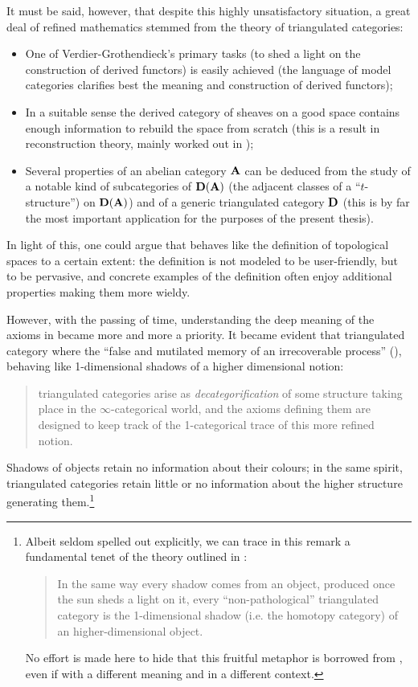 It must be said, however, that despite this highly unsatisfactory situation, a great deal of refined mathematics stemmed from the theory of triangulated categories:
\begin{itemize} 
\item One of Verdier\hyp{}Grothendieck's primary tasks (to shed a light on the construction of derived functors) is easily achieved (the language of model categories clarifies best the meaning and construction of derived functors); 
\item In a suitable sense the derived category of sheaves on a good space contains enough information to rebuild the space from scratch (this is a result in reconstruction theory, mainly worked out in \cite{bondal2001reconstruction});
\item {} Several properties of an abelian category $\textbf{A}$ can be deduced from the study of a notable kind of subcategories of $\textbf{D}(\textbf{A})$ (the adjacent classes of a ``$t$\hyp{}structure'') on $\textbf{D}(\textbf{A})$) and of a generic triangulated category $\textbf{D}$ (this is by far the most important application for the purposes of the present thesis).
\end{itemize}
In light of this, one could argue that \adef {} behaves like the definition of topological spaces to a certain extent: the definition is not modeled to be user\hyp{}friendly, but to be pervasive, and concrete examples of the definition often enjoy additional properties making them more wieldy. 

However, with the passing of time, understanding the deep meaning of the axioms in \adef {} became more and more a priority. It became evident that triangulated category where the ``false and mutilated memory of an irrecoverable process'' (\cite{borgesEN}), behaving like 1\hyp{}dimensional shadows of a higher dimensional notion: 
\begin{quote}
triangulated categories arise as \emph{decategorification} of some structure taking place in the $\infty$\hyp{}categorical world, and the axioms defining them are designed to keep track of the 1\hyp{}categorical trace of this more refined notion.
\end{quote}
Shadows of objects retain no information about their colours; in the same spirit, triangulated categories retain little or no information about the higher structure generating them.\footnote{Albeit seldom spelled out explicitly, we can trace in this remark a fundamental tenet of the theory outlined in \cite{LurieHA}:
\begin{quote}
In the same way every shadow comes from an object, produced once the sun sheds a light on it, every ``non\hyp{}pathological'' triangulated category is the 1\hyp{}dimensional shadow (i.e. the homotopy category) of an higher\hyp{}dimensional object.
\end{quote}
No effort is made here to hide that this fruitful metaphor is borrowed from \cite{Olivia}, even if with a different meaning and in a different context.}

